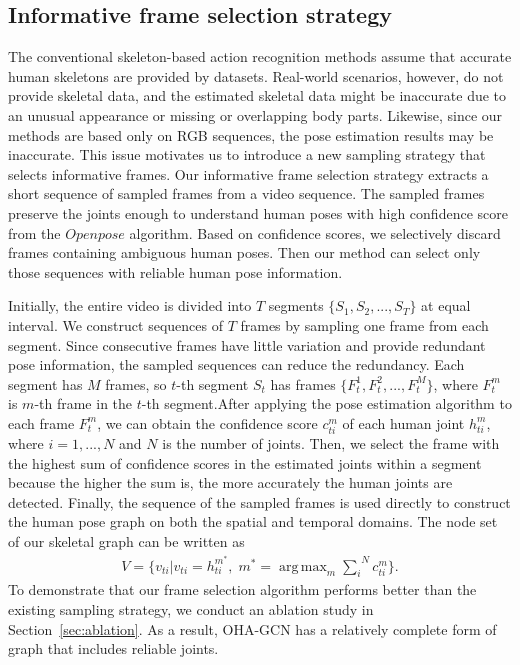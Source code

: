 \documentclass[10pt,twocolumn,letterpaper]{article}
\DeclareMathOperator*{\argmax}{arg\,max}
\begin{document}
\subsection{Informative frame selection strategy}
\label{sec:inf-select}

The conventional skeleton-based action recognition methods assume that accurate human skeletons are provided by datasets. 
Real-world scenarios, however, do not provide skeletal data, and the estimated skeletal data might be inaccurate due to an unusual appearance or missing or overlapping body parts.
Likewise, since our methods are based only on RGB sequences, the pose estimation results may be inaccurate.
This issue motivates us to introduce a new sampling strategy that selects informative frames. 
Our informative frame selection strategy extracts a short sequence of sampled frames from a video sequence. 
The sampled frames preserve the joints enough to understand human poses with high confidence score from the $Openpose$ algorithm.
Based on confidence scores, we selectively discard frames containing ambiguous human poses.
Then our method can select only those sequences with reliable human pose information. 


Initially, the entire video is divided into $T$ segments $\{S_1,S_2,...,S_T\}$ at equal interval.
We construct sequences of $T$ frames by sampling one frame from each segment.
Since consecutive frames have little variation and provide redundant pose information, the sampled sequences can reduce the redundancy.
Each segment has $M$ frames, so $t$-th segment $S_t$ has frames $\{F^1_{t},F^2_{t},...,F^M_{t}\}$, where $F^m_{t}$ is $m$-th frame in the $t$-th segment.After applying the pose estimation algorithm to each frame $F^m_{t}$, we can obtain the confidence score $c^m_{ti}$ of each human joint $h^m_{ti}$, where $i=1,...,N$ and $N$ is the number of joints.
Then, we select the frame with the highest sum of confidence scores in the estimated joints within a segment because the higher the sum is, the more accurately the human joints are detected.
Finally, the sequence of the sampled frames is used directly to construct the human pose graph on both the spatial and temporal domains.
The node set of our skeletal graph can be written as
\begin{equation}
\begin{aligned}
\label{eq:informative}
V=\{v_{ti}|v_{ti}=h^{m^{*}}_{ti},\; m^*=\argmax_{m} {\overset{N}{\underset{i}{\sum}}c^m_{ti}}\}.
\end{aligned}
\end{equation}
To demonstrate that our frame selection algorithm performs better than the existing sampling strategy, we conduct an ablation study in Section~\ref{sec:ablation}.
As a result, OHA-GCN has a relatively complete form of graph that includes reliable joints.
\end{document}
